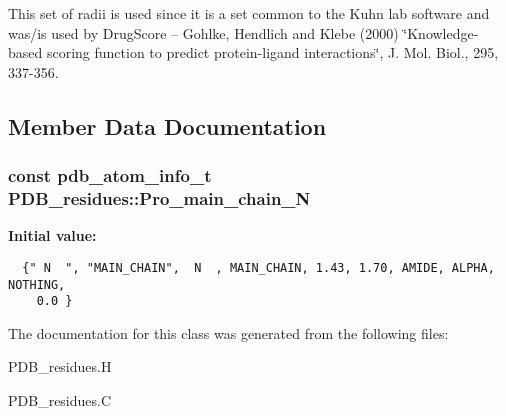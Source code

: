 This set of radii is used since it is a set common to the Kuhn lab software and was/is used by Drug\-Score -- Gohlke, Hendlich and Klebe (2000) \char`\"{}Knowledge-based scoring function to predict protein-ligand interactions\char`\"{}, J. Mol. Biol., 295, 337-356. 



\subsection{Member Data Documentation}
\subsubsection{\setlength{\rightskip}{0pt plus 5cm}const \bf{pdb\_\-atom\_\-info\_\-t} PDB\_\-residues::Pro\_\-main\_\-chain\_\-N\hspace{0.3cm}{\tt  [static, private]}}\label{classSimSite3D_1_1PDB__residues_cfc070f7fe10d5ab89d719e306d81485}


\textbf{Initial value:}

\begin{Code}\begin{verbatim}
  {" N  ", "MAIN_CHAIN",  N  , MAIN_CHAIN, 1.43, 1.70, AMIDE, ALPHA, NOTHING, 
    0.0 }
\end{verbatim}\end{Code}


The documentation for this class was generated from the following files:\begin{CompactItemize}
\item 
PDB\_\-residues.H\item 
PDB\_\-residues.C\end{CompactItemize}
